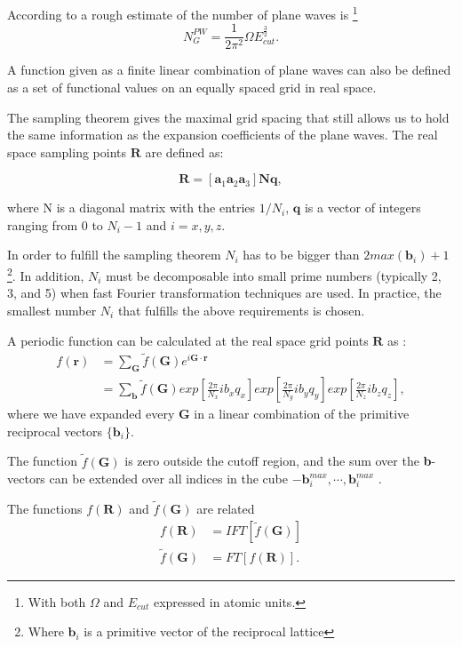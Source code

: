 \documentclass[a4paper,12pt]{article}
\newcommand\mf[1]{\mathbf{#1}}
\newcommand\erre{\mathbf{r}}
\newcommand\GI{\mathbf{G}}
\begin{document}
According to \cite[p.88]{Marx} a rough estimate of the number of plane waves is \footnote{With both $\Omega$ and $E_{cut}$ expressed in atomic units.}
\begin{equation}\label{eq:NGPW}
	N_{G}^{PW} = \frac{1}{2\pi^2}\Omega E_{cut}^{\frac{3}{2}}.
\end{equation}

A function given as a finite linear combination of plane waves can also be defined as a set of functional values on an equally spaced grid in real space.

The sampling theorem gives the maximal grid spacing
that still allows us to hold the same information as the expansion coefficients
of the plane waves. The real space sampling points $\mf{R}$ are defined as: 

\begin{equation}
	\mf{R} = \left[\mf{a}_1 \mf{a}_2 \mf{a}_3 \right] \mf{N} \mf{q},
\end{equation}

where N is a diagonal matrix with the entries $1/N_i$, $\mf{q}$ is a vector of
integers ranging from $0$ to $N_i - 1$ and $i = x, y, z$. 

In order to fulfill the
sampling theorem $N_i$ has to be bigger than $2 max(\mf{b}_i) + 1$\footnote{Where $\mf{b}_i$ is a primitive vector of the reciprocal lattice}. 
In addition, $N_i$ must be decomposable into small prime numbers (typically 2, 3, and 5) when fast Fourier transformation techniques are used.
In practice, the smallest number $N_i$ that fulfills the above requirements is
chosen.

A periodic function can be calculated at the real space grid points $\mf{R}$ as \cite[p.89]{Marx} :
\begin{align}
	f(\erre) &= \sum_{\GI} \tilde{f}(\GI) e^{i \GI \cdot \erre} \\
			 &= \sum_{\mf{b}} \tilde{f}(\GI) exp\left[ \frac{2\pi}{N_{x}} i b_x q_x \right]  exp\left[ \frac{2\pi}{N_{y}} i b_y q_y \right]  exp\left[ \frac{2\pi}{N_{z}} i b_z q_z \right], \label{eq:FFTDef}
\end{align}
where we have expanded every $\GI$ in a linear combination of the primitive reciprocal vectors $\{\mf{b}_i\}$.

The function $\tilde{f}(\GI)$ is zero outside the cutoff region, and the sum over the \textbf{b}-vectors can be extended over all indices in the cube $-\mf{b}_{i}^{max} , \cdots ,\mf{b}_{i}^{max}$ . 

The functions $f(\mf{R})$ and $\tilde{f}(\GI)$ are related
\begin{align}
	f(\mf{R}) &= IFT[ \tilde{f}(\GI) ]\\
	\tilde{f}(\GI) &= FT[ f(\mf{R}) ].
\end{align}
\end{document}
